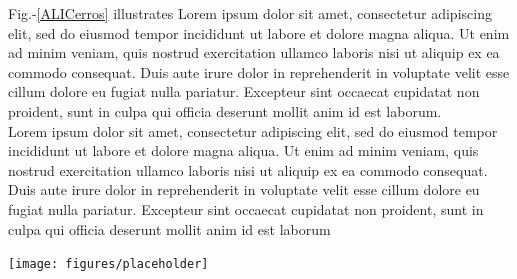 \documentclass[a0,portrait]{a0poster}
\begin{document}
\begin{minipage}[c]{\linewidth}
\begin{framed}
\begin{multicols}{2}
Fig.-\ref{ALICerros} illustrates Lorem ipsum dolor sit amet, consectetur adipiscing elit, sed do eiusmod tempor incididunt ut labore et dolore magna aliqua. Ut enim ad minim veniam, quis nostrud exercitation ullamco laboris nisi ut aliquip ex ea commodo consequat. Duis aute irure dolor in reprehenderit in voluptate velit esse cillum dolore eu fugiat nulla pariatur. Excepteur sint occaecat cupidatat non proident, sunt in culpa qui officia deserunt mollit anim id est laborum.\\
Lorem ipsum dolor sit amet, consectetur adipiscing elit, sed do eiusmod tempor incididunt ut labore et dolore magna aliqua. Ut enim ad minim veniam, quis nostrud exercitation ullamco laboris nisi ut aliquip ex ea commodo consequat. Duis aute irure dolor in reprehenderit in voluptate velit esse cillum dolore eu fugiat nulla pariatur. Excepteur sint occaecat cupidatat non proident, sunt in culpa qui officia deserunt mollit anim id est laborum
\vspace{0.1cm}
\begin{center}
\texttt{[image: figures/placeholder]}
\label{GIMlatlon}
\end{center}
\color{Black}

\end{multicols}
\end{framed}
\end{minipage}
\end{document}
